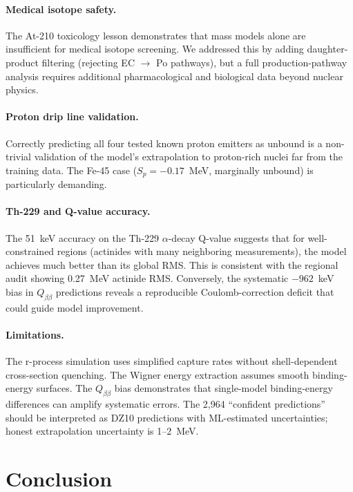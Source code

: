 \documentclass[twocolumn,letterpaper,10pt]{article}
\begin{document}
\paragraph{Medical isotope safety.}
The At-210 toxicology lesson demonstrates that mass models alone are
insufficient for medical isotope screening. We addressed this by adding
daughter-product filtering (rejecting EC $\to$ Po pathways), but a full
production-pathway analysis requires additional pharmacological and
biological data beyond nuclear physics.

\paragraph{Proton drip line validation.}
Correctly predicting all four tested known proton emitters as unbound is a
non-trivial validation of the model's extrapolation to proton-rich nuclei
far from the training data. The Fe-45 case ($S_p = -0.17$~MeV, marginally
unbound) is particularly demanding.

\paragraph{Th-229 and Q-value accuracy.}
The 51~keV accuracy on the Th-229 $\alpha$-decay Q-value suggests that
for well-constrained regions (actinides with many neighboring measurements),
the model achieves much better than its global RMS. This is consistent with
the regional audit showing 0.27~MeV actinide RMS. Conversely, the
systematic $-962$~keV bias in $Q_{\beta\beta}$ predictions reveals a
reproducible Coulomb-correction deficit that could guide model improvement.

\paragraph{Limitations.}
The r-process simulation uses simplified capture rates without
shell-dependent cross-section quenching. The Wigner energy extraction
assumes smooth binding-energy surfaces. The $Q_{\beta\beta}$ bias
demonstrates that single-model binding-energy differences can amplify
systematic errors. The 2,964 ``confident predictions'' should be
interpreted as DZ10 predictions with ML-estimated uncertainties; honest
extrapolation uncertainty is 1--2~MeV.

\section{Conclusion}
\end{document}
